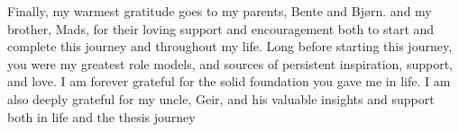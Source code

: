 \documentclass[../main.tex]{subfiles}
\begin{document}
Finally, my warmest gratitude goes to my parents, Bente and Bjørn. and
my brother, Mads, for their loving support and encouragement both to
start and complete this journey and throughout my life. Long before
starting this journey, you were my greatest role models, and sources
of persistent inspiration, support, and love. I am forever grateful
for the solid foundation you gave me in life. I am also deeply
grateful for my uncle, Geir, and his valuable insights and support
both in life and the thesis journey

\newpage
\end{document}
